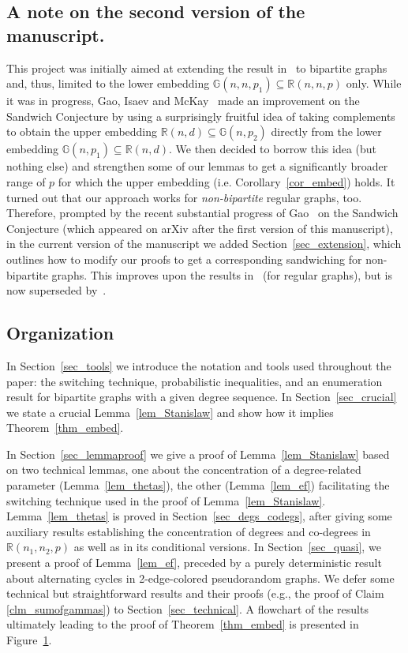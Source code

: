 \documentclass[12pt,reqno]{amsart}
\newcommand{\R} {\mathbb R}
\newcommand{\Rnnp}{\R(n_1,n_2,p)}
\newcommand{\G} {\mathbb G}
\theoremstyle{definition}
\begin{document}
\subsection{A note on the second version of the manuscript.}
\label{non}
This project was initially aimed at extending the result in~\cite{DFRSc} to bipartite graphs and, thus,  limited to the lower embedding $\G(n,n,p_1) \subseteq \R(n,n,p)$ only. While it was in progress, Gao, Isaev and McKay~\cite{GIM} made an improvement on the Sandwich Conjecture by using a surprisingly fruitful idea of taking complements to obtain the upper embedding $\R(n,d) \subseteq \G(n,p_2)$ directly from the lower embedding $\G(n,p_1) \subseteq \R(n,d)$. We then decided to borrow this idea (but nothing else) and strengthen some of our lemmas to get a significantly broader range of $p$ for which the upper embedding (i.e. Corollary~\ref{cor_embed}) holds. It turned out that our approach works for \emph{non-bipartite} regular graphs, too. Therefore, prompted by the recent substantial progress of Gao~\cite{G20} on the Sandwich Conjecture (which appeared on arXiv after the first version of this manuscript), in the current version of the manuscript we added Section~\ref{sec_extension}, which outlines how to modify our proofs to get a corresponding sandwiching for non-bipartite graphs. This improves upon the results in~\cite{GIM} (for regular graphs), but is now superseded by~\cite{G20}.

\subsection{Organization}
\begin{figure}[omitted: a diagram of this paper's results, not reproduced here]\label{fig_flowchart}\end{figure}
 In Section~\ref{sec_tools} we introduce the notation and tools used throughout the paper: the switching technique, probabilistic inequalities, and an enumeration result for bipartite graphs with a given degree sequence. In Section~\ref{sec_crucial} we state a crucial Lemma~\ref{lem_Stanislaw} and show how it implies Theorem~\ref{thm_embed}.

 In Section~\ref{sec_lemmaproof} we  give a proof of Lemma~\ref{lem_Stanislaw} based on two technical lemmas, one about the concentration of a degree-related parameter (Lemma~\ref{lem_thetas}), the other (Lemma~\ref{lem_ef}) facilitating the switching technique used in the proof of Lemma~\ref{lem_Stanislaw}. Lemma~\ref{lem_thetas} is proved in Section~\ref{sec_degs_codegs}, after giving some auxiliary results establishing the concentration of degrees and co-degrees in $\Rnnp$ as well as in its conditional versions.  In Section~\ref{sec_quasi}, we present a proof of Lemma~\ref{lem_ef}, preceded by a purely deterministic result about alternating cycles in 2-edge-colored pseudorandom graphs.
 We defer some technical but straightforward results and their proofs (e.g., the proof of Claim \ref{clm_sumofgammas}) to Section~\ref{sec_technical}.
 A flowchart of the results ultimately leading to the proof of Theorem~\ref{thm_embed} is presented in Figure~\ref{fig_flowchart}.
\end{document}
